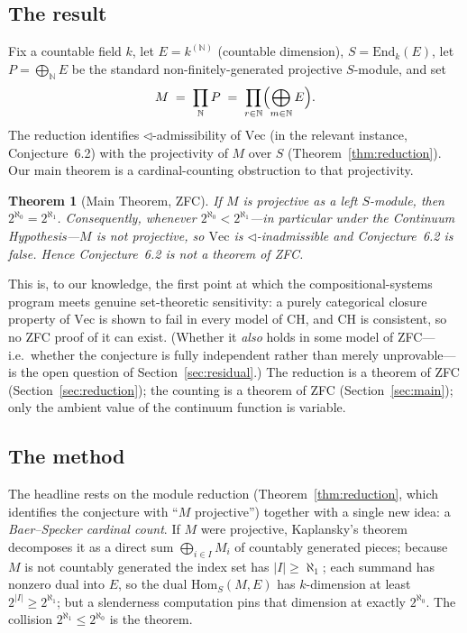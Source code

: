 \documentclass[11pt,reqno]{amsart}
\theoremstyle{plain}
\newtheorem{theorem}{Theorem}[section]
\theoremstyle{definition}
\theoremstyle{remark}
\renewcommand{\Vec}{\mathrm{Vec}}
\newcommand{\End}{\mathrm{End}}
\newcommand{\Hom}{\mathrm{Hom}}
\newcommand{\tri}{\triangleleft}
\newcommand{\N}{\mathbb{N}}
\begin{document}
\subsection*{The result}
Fix a countable field $k$, let $E=k^{(\N)}$ (countable dimension), $S=\End_k(E)$, let $P=\bigoplus_{\N}E$ be the standard non-finitely-generated projective $S$-module, and set
\[
  M \;=\; \prod_{\N} P \;=\; \prod_{r\in\N}\Bigl(\bigoplus_{m\in\N} E\Bigr).
\]
The reduction identifies $\tri$-admissibility of $\Vec$ (in the relevant instance, Conjecture~6.2) with the projectivity of $M$ over $S$ (Theorem~\ref{thm:reduction}). Our main theorem is a cardinal-counting obstruction to that projectivity.

\begin{theorem}[Main Theorem, ZFC]\label{thm:main-intro}
If $M$ is projective as a left $S$-module, then $2^{\aleph_0}=2^{\aleph_1}$. Consequently, whenever $2^{\aleph_0}<2^{\aleph_1}$---in particular under the Continuum Hypothesis---$M$ is not projective, so $\Vec$ is $\tri$-inadmissible and Conjecture~6.2 is false. Hence \emph{Conjecture~6.2 is not a theorem of \textup{ZFC}}.
\end{theorem}

This is, to our knowledge, the first point at which the compositional-systems program meets genuine set-theoretic sensitivity: a purely categorical closure property of $\Vec$ is shown to fail in every model of CH, and CH is consistent, so no ZFC proof of it can exist. (Whether it \emph{also} holds in some model of ZFC---i.e.\ whether the conjecture is fully independent rather than merely unprovable---is the open question of Section~\ref{sec:residual}.) The reduction is a theorem of ZFC (Section~\ref{sec:reduction}); the counting is a theorem of ZFC (Section~\ref{sec:main}); only the ambient value of the continuum function is variable.

\subsection*{The method}
The headline rests on the module reduction (Theorem~\ref{thm:reduction}, which identifies the conjecture with ``$M$ projective'') together with a single new idea: a \emph{Baer--Specker cardinal count}. If $M$ were projective, Kaplansky's theorem~\cite{kaplansky} decomposes it as a direct sum $\bigoplus_{i\in I}M_i$ of countably generated pieces; because $M$ is not countably generated the index set has $|I|\ge\aleph_1$; each summand has nonzero dual into $E$, so the dual $\Hom_S(M,E)$ has $k$-dimension at least $2^{|I|}\ge 2^{\aleph_1}$; but a slenderness computation pins that dimension at exactly $2^{\aleph_0}$. The collision $2^{\aleph_1}\le 2^{\aleph_0}$ is the theorem.
\end{document}
